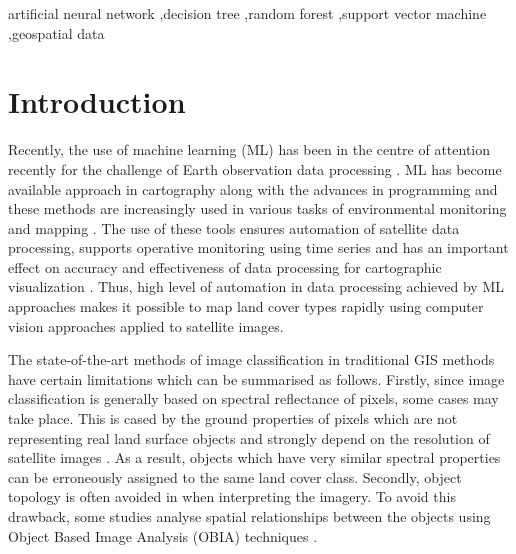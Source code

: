 \documentclass[preprint,12pt,authoryear]{elsarticle}
\begin{document}
\begin{frontmatter}
\begin{keyword}
artificial neural network \sep decision tree \sep random forest \sep support vector machine \sep geospatial data
\end{keyword}

\end{frontmatter}

\linenumbers


\section{Introduction}\label{Int}

Recently, the use of machine learning (ML) has been in the centre of attention recently for the challenge of Earth observation data processing \cite{9395808,10041606,Lemenkova202320,8547145}. ML has become available approach in cartography along with the advances in programming and these methods are increasingly used in various tasks of environmental monitoring and mapping \cite{10142835,jimaging9050098,9850602}. The use of these tools ensures automation of satellite data processing, supports operative monitoring using time series and has an important effect on accuracy and effectiveness of data processing for cartographic visualization \cite{jmse12081279}. Thus, high level of automation in data processing achieved by ML approaches makes it possible to map land cover types rapidly using computer vision approaches applied to satellite images.

The state-of-the-art methods of image classification in traditional GIS methods have certain limitations which can be summarised as follows. Firstly, since image classification is generally based on spectral reflectance of pixels, some cases may take place. This is cased by the ground properties of pixels which are not representing real land surface objects and strongly depend on the resolution of satellite images \cite{6351712,Lemenkova202322}. As a result, objects which have very similar spectral properties can be erroneously assigned to the same land cover class. Secondly, object topology is often avoided in when interpreting the imagery. To avoid this drawback, some studies analyse spatial relationships between the objects using Object Based Image Analysis (OBIA) techniques \cite{LUCIANO2019127,PHIRI2018170,DEWALI20233109,MAO202011}. 
\end{document}
